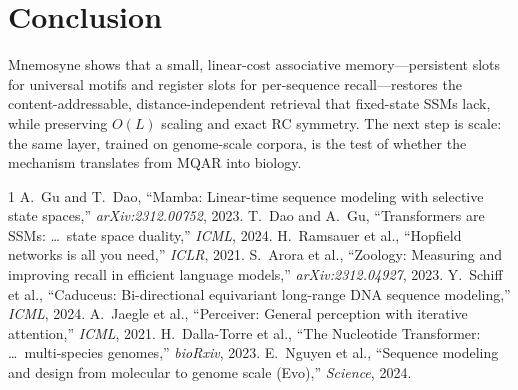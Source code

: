 \documentclass[10pt,journal]{IEEEtran}
\begin{document}
\section{Conclusion}
Mnemosyne shows that a small, linear-cost associative memory---persistent slots
for universal motifs and register slots for per-sequence recall---restores the
content-addressable, distance-independent retrieval that fixed-state SSMs lack,
while preserving $O(L)$ scaling and exact RC symmetry. The next step is scale: the
same layer, trained on genome-scale corpora, is the test of whether the mechanism
translates from MQAR into biology.


\begin{thebibliography}{1}
 A.~Gu and T.~Dao, ``Mamba: Linear-time sequence modeling
with selective state spaces,'' \emph{arXiv:2312.00752}, 2023.
 T.~Dao and A.~Gu, ``Transformers are SSMs: \ldots\ state
space duality,'' \emph{ICML}, 2024.
 H.~Ramsauer et al., ``Hopfield networks is all you
need,'' \emph{ICLR}, 2021.
 S.~Arora et al., ``Zoology: Measuring and improving
recall in efficient language models,'' \emph{arXiv:2312.04927}, 2023.
 Y.~Schiff et al., ``Caduceus: Bi-directional
equivariant long-range DNA sequence modeling,'' \emph{ICML}, 2024.
 A.~Jaegle et al., ``Perceiver: General perception
with iterative attention,'' \emph{ICML}, 2021.
 H.~Dalla-Torre et al., ``The Nucleotide Transformer:
\ldots\ multi-species genomes,'' \emph{bioRxiv}, 2023.
 E.~Nguyen et al., ``Sequence modeling and design from
molecular to genome scale (Evo),'' \emph{Science}, 2024.
\end{thebibliography}
\end{document}
